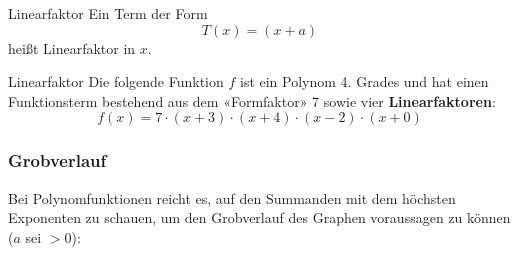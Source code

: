 \begin{definition}{Linearfaktor}{}
  Ein Term der Form
  $$T(x) = (x+a)$$
  heißt Linearfaktor in $x$.
\end{definition}

\begin{beispiel}{Linearfaktor}{}
  Die folgende Funktion $f$ ist ein Polynom 4. Grades und hat einen
  Funktionsterm bestehend aus dem «Formfaktor» 7 sowie vier \textbf{Linearfaktoren}:
  $$f(x) = 7\cdot{}(x+3)\cdot{}(x+4)\cdot{}(x-2)\cdot{}(x+0)$$
\end{beispiel}




\newpage
\subsubsection{Grobverlauf}
Bei Polynomfunktionen reicht es, auf den Summanden mit dem höchsten Exponenten zu schauen, um den Grobverlauf des Graphen voraussagen zu können ($a$ sei $> 0$):

